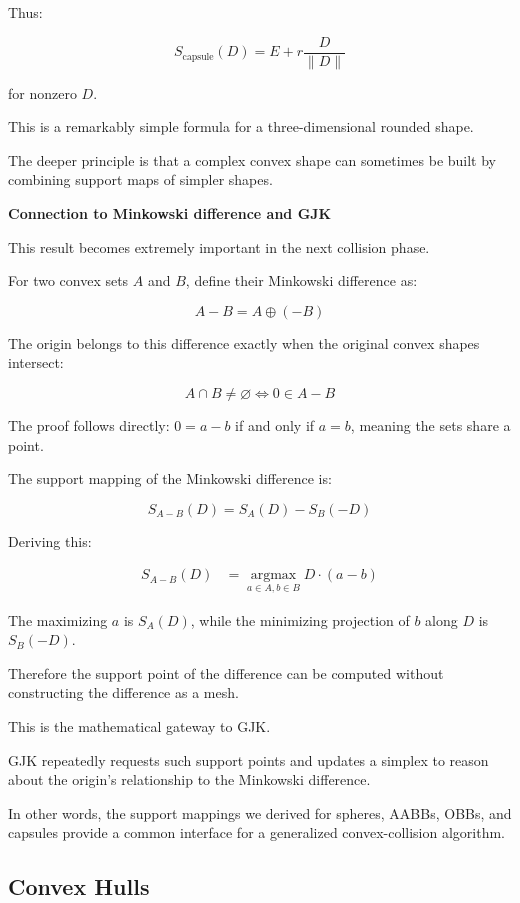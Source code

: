 Thus:

\[
\boxed{ S_{\mathrm{capsule}}(D) = E+r\frac{D}{\|D\|} }
\]

for nonzero \(D\).

This is a remarkably simple formula for a three-dimensional rounded shape.

The deeper principle is that a complex convex shape can sometimes be built by combining support maps of simpler shapes.

\textbf{Connection to Minkowski difference and GJK}

This result becomes extremely important in the next collision phase.

For two convex sets \(A\) and \(B\), define their Minkowski difference as:

\[
A-B=A\oplus(-B)
\]

The origin belongs to this difference exactly when the original convex shapes intersect:

\[
\boxed{ A\cap B\ne\varnothing \iff 0\in A-B }
\]

The proof follows directly: \(0=a-b\) if and only if \(a=b\), meaning the sets share a point.

The support mapping of the Minkowski difference is:

\[
\boxed{ S_{A-B}(D)=S_A(D)-S_B(-D) }
\]

Deriving this:

\[
\begin{aligned} S_{A-B}(D) &=\underset{a\in A,b\in B}{\operatorname{argmax}} D\cdot(a-b) \end{aligned}
\]

The maximizing \(a\) is \(S_A(D)\), while the minimizing projection of \(b\) along \(D\) is \(S_B(-D)\).

Therefore the support point of the difference can be computed without constructing the difference as a mesh.

This is the mathematical gateway to GJK.

GJK repeatedly requests such support points and updates a simplex to reason about the origin's relationship to the Minkowski difference.

In other words, the support mappings we derived for spheres, AABBs, OBBs, and capsules provide a common interface for a generalized convex-collision algorithm.

\subsection{Convex Hulls}\label{04-visual-computing-ii-ch022-convex-hulls}

